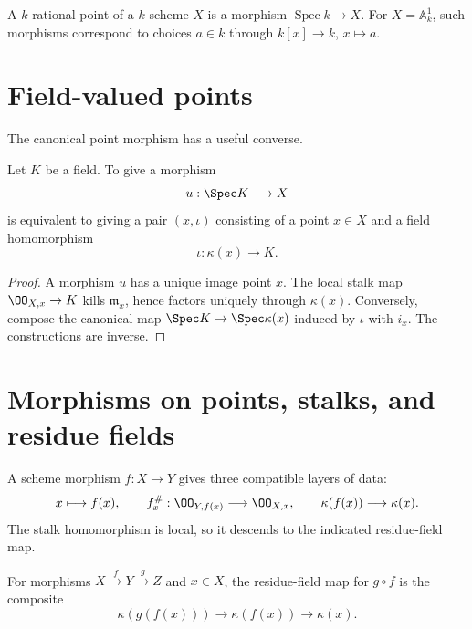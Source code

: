 

\begin{example}\label{ex:vi21-expand-01}
A $k$-rational point of a $k$-scheme $X$ is a morphism $\operatorname{Spec}k\to X$.  For $X=\mathbb A^1_k$, such morphisms correspond to choices $a\in k$ through $k[x]\to k$, $x\mapsto a$.
\end{example}
\section{Field-valued points}
The canonical point morphism has a useful converse.

\begin{theorem}\label{thm:vi21-field-valued-points}
Let $K$ be a field.  To give a morphism
\[
 u:\Spec K\longrightarrow X
\]
is equivalent to giving a pair $(x,\iota)$ consisting of a point $x\in X$ and a field
homomorphism
\[
 \iota:\kappa(x)\longrightarrow K.
\]
\end{theorem}
\begin{proof}
A morphism $u$ has a unique image point $x$.  The local stalk map
$\OO_{X,x}\to K$ kills $\mathfrak m_x$, hence factors uniquely through $\kappa(x)$.  Conversely,
compose the canonical map $\Spec K\to\Spec\kappa(x)$ induced by $\iota$ with $i_x$.
The constructions are inverse.
\end{proof}



\section{Morphisms on points, stalks, and residue fields}
A scheme morphism $f:X\to Y$ gives three compatible layers of data:
\[
 x\longmapsto f(x),\qquad
 f_x^\#:\OO_{Y,f(x)}\longrightarrow\OO_{X,x},\qquad
 \kappa(f(x))\longrightarrow\kappa(x).
\]
The stalk homomorphism is local, so it descends to the indicated residue-field map.

\begin{proposition}\label{prop:vi21-residue-functoriality}
For morphisms $X\xrightarrow{f}Y\xrightarrow{g}Z$ and $x\in X$, the residue-field map for
$g\circ f$ is the composite
\[
 \kappa(g(f(x)))\longrightarrow\kappa(f(x))\longrightarrow\kappa(x).
\]
\end{proposition}

